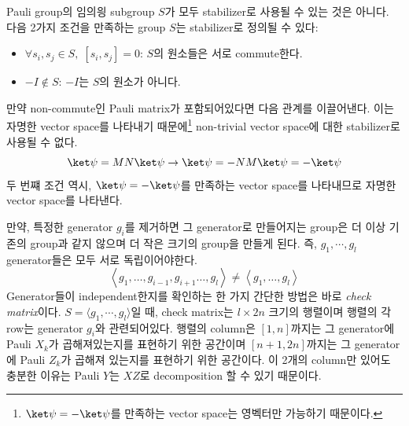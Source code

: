 Pauli group의 임의읭 subgroup $S$가 모두 stabilizer로 사용될 수 있는 것은 아니다. 다음 2가지 조건을 만족하는 group $S$는 stabilizer로 정의될 수 있다:
\begin{itemize}
    \item $\forall s_i, s_j \in S, \; [s_i, s_j] = 0$: $S$의 원소들은 서로 commute한다.
    \item $-I \notin S$: $-I$는 $S$의 원소가 아니다.
\end{itemize}
만약 non-commute인 Pauli matrix가 포함되어있다면 다음 관계를 이끌어낸다. 이는 자명한 vector space를 나타내기 때문에\footnote{$\ket \psi = - \ket \psi$를 만족하는 vector space는 영벡터만 가능하기 때문이다.} non-trivial vector space에 대한 stabilizer로 사용될 수 없다.
\begin{equation*}
    \ket \psi = MN \ket \psi \rightarrow \ket \psi = -NM \ket \psi = - \ket \psi    
\end{equation*}
두 번쨰 조건 역시, $\ket \psi = - \ket \psi$를 만족하는 vector space를 나타내므로 자명한 vector space를 나타낸다.

\vspace{1em}

만약, 특정한 generator $g_i$를 제거하면 그 generator로 만들어지는 group은 더 이상 기존의 group과 같지 않으며 더 작은 크기의 group을 만들게 된다. 즉, $g_1, \cdots, g_l$ generator들은 모두 서로 독립이어야한다.
\begin{equation*}
    \left\langle g_1, \ldots, g_{i-1}, g_{i+1} \ldots, g_l\right\rangle \neq\left\langle g_1, \ldots, g_l\right\rangle
\end{equation*}
Generator들이 independent한지를 확인하는 한 가지 간단한 방법은 바로 \textit{check matrix}이다. $S = \langle g_1, \cdots, g_l\rangle$일 때, check matrix는 $l \times 2n$ 크기의 행렬이며 행렬의 각 row는 generator $g_i$와 관련되어있다. 
행렬의 column은 $[1, n]$까지는 그 generator에 Pauli $X_k$가 곱해져있는지를 표현하기 위한 공간이며 $[n+1, 2n]$까지는 그 generator에 Pauli $Z_k$가 곱해져 있는지를 표현하기 위한 공간이다. 이 2개의 column만 있어도 충분한 이유는 Pauli $Y$는 $XZ$로 decomposition 할 수 있기 때문이다.

